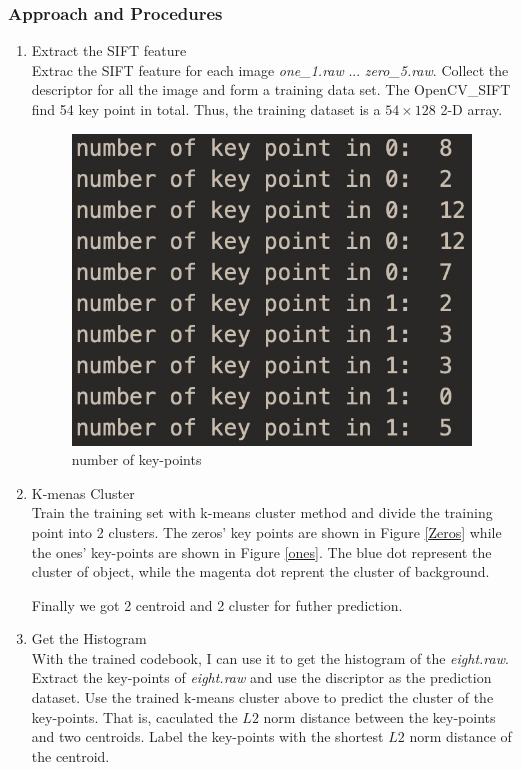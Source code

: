 \documentclass[11pt]{article}
\begin{document}
\subsubsection{Approach and Procedures}
\begin{enumerate}
\item Extract the SIFT feature\\
Extrac the SIFT feature for each image {\it one\_1.raw} ... {\it zero\_5.raw}. Collect the descriptor for all the image and form a training data set. The OpenCV\_SIFT find 54 key point in total. Thus, the training dataset is a $54 \times 128$ 2-D array.

\begin{figure}[!htp]
	\centering
	\includegraphics[scale=0.4]{trainset.png}
	\caption{number of key-points}
	\end{figure}
\item K-menas Cluster\\
Train the training set with k-means cluster method and divide the training point into 2 clusters. The zeros' key points are shown in Figure \ref{Zeros} while the ones' key-points are shown in Figure \ref{ones}. The blue dot represent the cluster of object, while the magenta dot reprent the cluster of background.



Finally we got 2 centroid and 2 cluster for futher prediction.
\item Get the Histogram \\
With the trained codebook, I can use it to get the histogram of the {\it eight.raw}. Extract the key-points of {\it eight.raw} and use the discriptor as the prediction dataset. Use the trained k-means cluster above to predict the cluster of the key-points. That is, caculated the $L2$ norm distance between the key-points and two centroids. Label the key-points with the shortest $L2$ norm distance of the centroid.


\end{enumerate}
\end{document}
